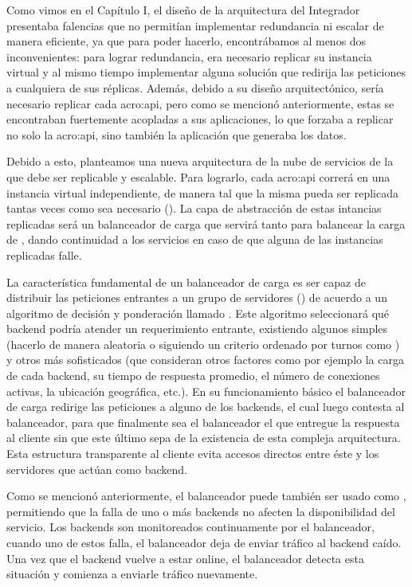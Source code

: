 Como vimos en el Capítulo I, el diseño de la arquitectura del Integrador presentaba falencias que no permitían implementar redundancia ni escalar de manera eficiente, ya que para poder hacerlo, encontrábamos al menos dos inconvenientes: para lograr redundancia, era necesario replicar su instancia virtual y al mismo tiempo implementar alguna solución que redirija las peticiones a cualquiera de sus réplicas.  Además, debido a su diseño arquitectónico, sería necesario replicar cada \gls{acro:api}, pero como se mencionó anteriormente, estas se encontraban fuertemente acopladas a sus aplicaciones, lo que forzaba a replicar no solo la \gls{acro:api}, sino también la aplicación que generaba los datos.

Debido a esto, planteamos una nueva arquitectura de la nube de servicios de la {\unlp} que debe ser replicable y escalable. Para lograrlo, cada \gls{acro:api} correrá en una instancia virtual independiente, de manera tal que la misma pueda ser replicada tantas veces como sea necesario (). La capa de abstracción de estas intancias replicadas será un balanceador de carga que servirá tanto para balancear la carga de , dando continuidad a los servicios en caso de que alguna de las instancias replicadas falle.

La característica fundamental de un balanceador de carga es ser capaz de distribuir las peticiones entrantes a un grupo de servidores () de acuerdo a un algoritmo de decisión y ponderación llamado . Este algoritmo seleccionará qué backend podría atender un requerimiento entrante, existiendo algunos simples (hacerlo de manera aleatoria o siguiendo un criterio ordenado por turnos como ) y otros más sofisticados (que consideran otros factores como por ejemplo la carga de cada backend, su tiempo de respuesta promedio, el número de conexiones activas, la ubicación geográfica, etc.). En su funcionamiento básico el balanceador de carga redirige las peticiones a alguno de los backends, el cual luego contesta al balanceador, para que finalmente sea el balanceador el que entregue la respuesta al cliente sin que este último sepa de la existencia de esta compleja arquitectura. Esta estructura transparente al cliente evita accesos directos entre éste y los servidores que actúan como backend.

Como se mencionó anteriormente, el balanceador puede también ser usado como , permitiendo que la falla de uno o más backends no afecten la disponibilidad del servicio. Los backends son monitoreados continuamente por el balanceador, cuando uno de estos falla, el balanceador deja de enviar tráfico al backend caído. Una vez que el backend vuelve a estar online, el balanceador detecta esta situación y comienza a enviarle tráfico nuevamente.

